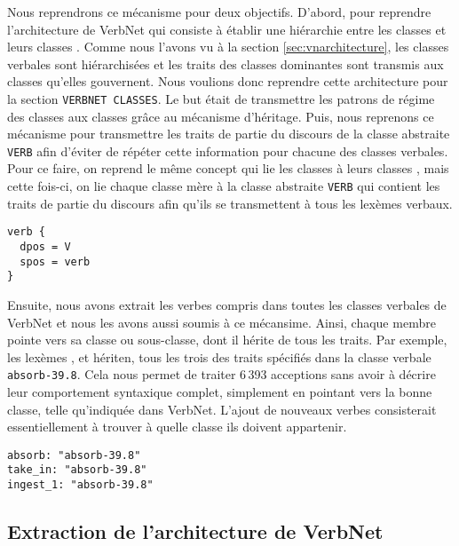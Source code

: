 Nous reprendrons ce mécanisme pour deux objectifs. D'abord, pour reprendre l'architecture de VerbNet qui consiste à établir une hiérarchie entre les classes  et leurs classes . Comme nous l'avons vu à la section \ref{sec:vnarchitecture}, les classes verbales sont hiérarchisées et les traits des classes dominantes sont transmis aux classes qu'elles gouvernent. Nous voulions donc reprendre cette architecture pour la section \texttt{VERBNET CLASSES}. Le but était de transmettre les patrons de régime des classes  aux classes  grâce au mécanisme d'héritage. Puis, nous reprenons ce mécanisme pour transmettre les traits de partie du discours de la classe abstraite \texttt{VERB} afin d'éviter de répéter cette information pour chacune des classes verbales. Pour ce faire, on reprend le même concept qui lie les classes  à leurs classes , mais cette fois-ci, on lie chaque classe mère à la classe abstraite \texttt{VERB} qui contient les traits de partie du discours afin qu'ils se transmettent à tous les lexèmes verbaux.

\begin{lstlisting}[language=mate, caption=Traits de la classe abstraite \texttt{VERB}]
verb {
  dpos = V
  spos = verb
}
\end{lstlisting}

Ensuite, nous avons extrait les verbes compris dans toutes les classes verbales de VerbNet et nous les avons aussi soumis à ce mécansime. Ainsi, chaque membre pointe vers sa classe ou sous-classe, dont il hérite de tous les traits. Par exemple, les lexèmes ,  et  hériten, tous les trois des traits spécifiés dans la classe verbale \texttt{absorb-39.8}. Cela nous permet de traiter 6\,393 acceptions sans avoir à décrire leur comportement syntaxique complet, simplement en pointant vers la bonne classe, telle qu'indiquée dans VerbNet. L'ajout de nouveaux verbes consisterait essentiellement à trouver à quelle classe ils doivent appartenir.

\begin{lstlisting}[language=mate, caption=Membres verbaux pointant vers leur classe]
absorb: "absorb-39.8"
take_in: "absorb-39.8"
ingest_1: "absorb-39.8"
\end{lstlisting}

\subsection{Extraction de l'architecture de VerbNet}

